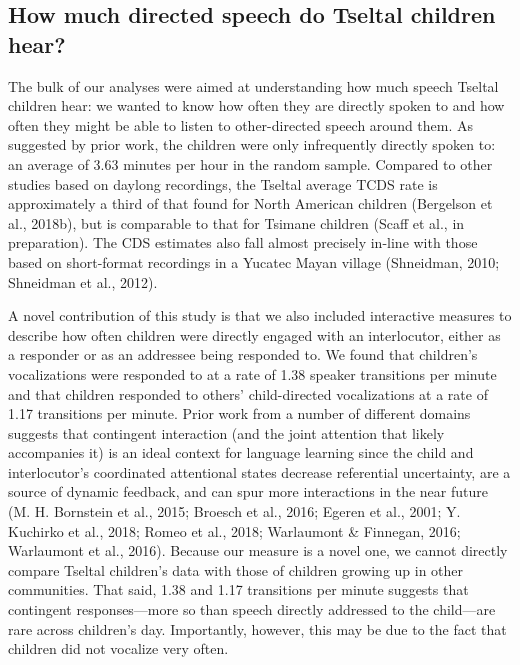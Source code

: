 \documentclass[floatsintext,man]{apa6}
\theoremstyle{definition}
\theoremstyle{definition}
\theoremstyle{definition}
\theoremstyle{remark}
\begin{document}
\subsection{How much directed speech do Tseltal children
hear?}\label{how-much-directed-speech-do-tseltal-children-hear}

The bulk of our analyses were aimed at understanding how much speech
Tseltal children hear: we wanted to know how often they are directly
spoken to and how often they might be able to listen to other-directed
speech around them. As suggested by prior work, the children were only
infrequently directly spoken to: an average of 3.63 minutes per hour in
the random sample. Compared to other studies based on daylong
recordings, the Tseltal average TCDS rate is approximately a third of
that found for North American children (Bergelson et al., 2018b), but is
comparable to that for Tsimane children (Scaff et al., in preparation).
The CDS estimates also fall almost precisely in-line with those based on
short-format recordings in a Yucatec Mayan village (Shneidman, 2010;
Shneidman et al., 2012).

A novel contribution of this study is that we also included interactive
measures to describe how often children were directly engaged with an
interlocutor, either as a responder or as an addressee being responded
to. We found that children's vocalizations were responded to at a rate
of 1.38 speaker transitions per minute and that children responded to
others' child-directed vocalizations at a rate of 1.17 transitions per
minute. Prior work from a number of different domains suggests that
contingent interaction (and the joint attention that likely accompanies
it) is an ideal context for language learning since the child and
interlocutor's coordinated attentional states decrease referential
uncertainty, are a source of dynamic feedback, and can spur more
interactions in the near future (M. H. Bornstein et al., 2015; Broesch
et al., 2016; Egeren et al., 2001; Y. Kuchirko et al., 2018; Romeo et
al., 2018; Warlaumont \& Finnegan, 2016; Warlaumont et al., 2016).
Because our measure is a novel one, we cannot directly compare Tseltal
children's data with those of children growing up in other communities.
That said, 1.38 and 1.17 transitions per minute suggests that contingent
responses---more so than speech directly addressed to the child---are
rare across children's day. Importantly, however, this may be due to the
fact that children did not vocalize very often.
\end{document}
